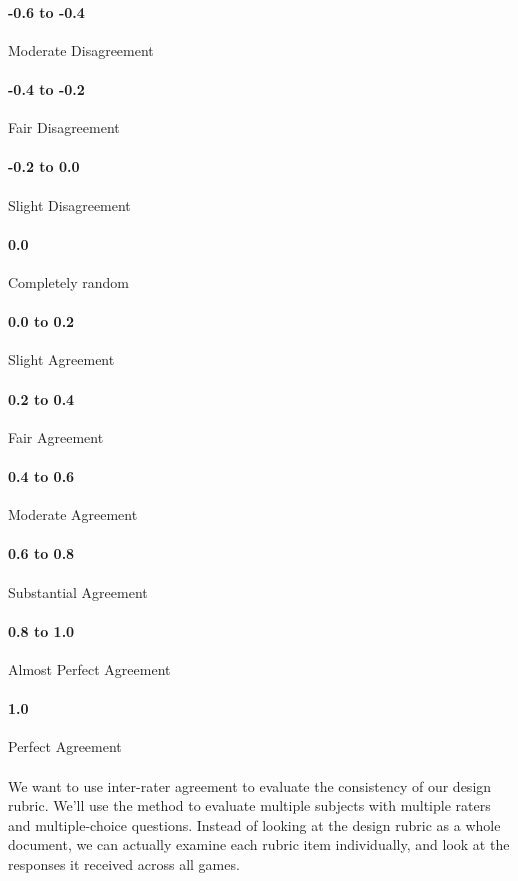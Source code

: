 				\paragraph{-0.6 to -0.4} Moderate Disagreement

				\paragraph{-0.4 to -0.2} Fair Disagreement

				\paragraph{-0.2 to 0.0} Slight Disagreement

				\paragraph{0.0} Completely random

				\paragraph{0.0 to 0.2} Slight Agreement

				\paragraph{0.2 to 0.4} Fair Agreement

				\paragraph{0.4 to 0.6} Moderate Agreement

				\paragraph{0.6 to 0.8} Substantial Agreement

				\paragraph{0.8 to 1.0} Almost Perfect Agreement

				\paragraph{1.0} Perfect Agreement

				\paragraph{}We want to use inter-rater agreement to evaluate the consistency of our design rubric. We'll use the method to evaluate multiple subjects with multiple raters and multiple-choice questions. Instead of looking at the design rubric as a whole document, we can actually examine each rubric item individually, and look at the responses it received across all games.

